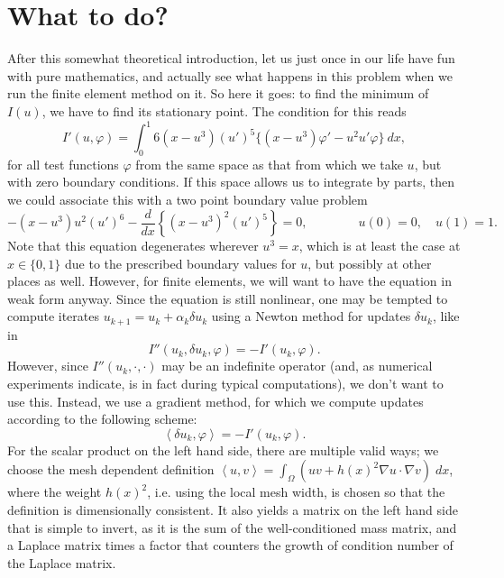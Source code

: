 \documentclass{article}
\begin{document}
\section{What to do?}

After this somewhat theoretical introduction, let us just once in our life
have fun with pure mathematics, and actually see what happens in this problem
when we run the finite element method on it. So here it goes: to find the
minimum of $I(u)$, we have to find its stationary point. The condition for
this reads
\begin{equation*}
  I'(u,\varphi) 
  = 
  \int_0^1 6 (x-u^3) (u')^5 \{ (x-u^3)\varphi' - u^2 u' \varphi\}\ dx,
\end{equation*}
for all test functions $\varphi$ from the same space as that from which we
take $u$, but with zero boundary conditions. If this space allows us to
integrate by parts, then we could associate this with a two point boundary
value problem
\begin{equation}
  \label{eq:equation}
  -(x-u^3) u^2(u')^6
  - \frac{d}{dx} \left\{(x-u^3)^2 (u')^5\right\} = 0,
  \qquad\qquad u(0)=0,
  \quad u(1)=1.
\end{equation}
Note that this equation degenerates wherever $u^3=x$, which is at least the
case at $x\in\{0,1\}$ due to the prescribed boundary values for $u$, but
possibly at other places as well.  However, for finite elements, we will want
to have the equation in weak form anyway.  Since the equation is still
nonlinear, one may be tempted to compute iterates
$u_{k+1}=u_k+\alpha_k\delta u_k$ using a Newton method for updates $\delta
u_k$, like in
\begin{equation*}
  I''(u_k,\delta u_k,\varphi) 
  = 
  -I'(u_k, \varphi).
\end{equation*}
However, since $I''(u_k,\cdot,\cdot)$ may be an indefinite operator (and, as
numerical experiments indicate, is in fact during typical computations), we
don't want to use this. Instead, we use a gradient method, for which we
compute updates according to the following scheme:
\begin{equation}
  \left<\delta u_k,\varphi\right>
  = 
  -I'(u_k, \varphi).
\end{equation}
For the scalar product on the left hand side, there are multiple valid ways;
we choose the mesh dependent definition $\left<u,v\right> = \int_\Omega (uv +
h(x)^2 \nabla u\cdot \nabla v)\; dx$, where the weight $h(x)^2$, i.e. using
the local mesh width, is chosen so that the definition is dimensionally
consistent. It also yields a matrix on the left hand side that is simple to
invert, as it is the sum of the well-conditioned mass matrix, and a Laplace
matrix times a factor that counters the growth of condition number of the
Laplace matrix.
\end{document}

